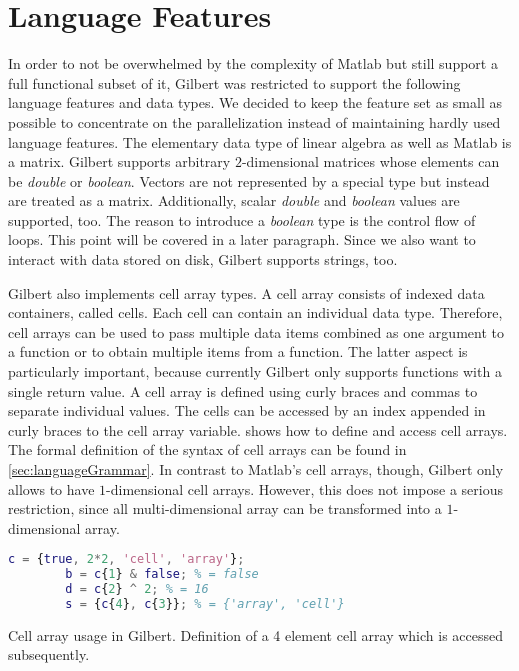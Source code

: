\section{Language Features}
\label{sec:languageFeatures}

In order to not be overwhelmed by the complexity of Matlab but still support a full functional subset of it, Gilbert was restricted to support the following language features and data types.
We decided to keep the feature set as small as possible to concentrate on the parallelization instead of maintaining hardly used language features.
The elementary data type of linear algebra as well as Matlab is a matrix.
Gilbert supports arbitrary $2$-dimensional matrices whose elements can be \emph{double} or \emph{boolean}.
Vectors are not represented by a special type but instead are treated as a matrix.
Additionally, scalar \emph{double} and \emph{boolean} values are supported, too.
The reason to introduce a \emph{boolean} type is the control flow of loops.
This point will be covered in a later paragraph.
Since we also want to interact with data stored on disk, Gilbert supports strings, too.

Gilbert also implements cell array types.
A cell array consists of indexed data containers, called cells.
Each cell can contain an individual data type.
Therefore, cell arrays can be used to pass multiple data items combined as one argument to a function or to obtain multiple items from a function.
The latter aspect is particularly important, because currently Gilbert only supports functions with a single return value.
A cell array is defined using curly braces and commas to separate individual values.
The cells can be accessed by an index appended in curly braces to the cell array variable.
 shows how to define and access cell arrays.
The formal definition of the syntax of cell arrays can be found in \cref{sec:languageGrammar}.
In contrast to Matlab's cell arrays, though, Gilbert only allows to have $1$-dimensional cell arrays.
However, this does not impose a serious restriction, since all multi-dimensional array can be transformed into a $1$-dimensional array. 

\begin{listing}[!h]
	\begin{CenteredBox}
		\begin{lstlisting}[language=Matlab]
		c = {true, 2*2, 'cell', 'array'};
		b = c{1} & false; % = false
		d = c{2} ^ 2; % = 16
		s = {c{4}, c{3}}; % = {'array', 'cell'} 
		\end{lstlisting}
	\end{CenteredBox}
	\caption{Cell array usage in Gilbert. Definition of a 4 element cell array which is accessed subsequently.}
	\label{lst:cellArray}
\end{listing}

